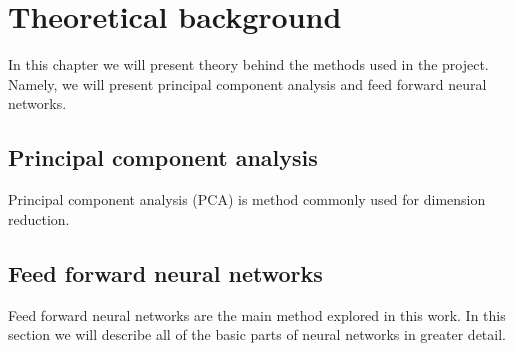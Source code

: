 \chapter{Theoretical background}
\label{chap:background}

In this chapter we will present theory behind the methods used in the project. 
Namely, we will present principal component analysis and feed forward neural networks.

\section{Principal component analysis}
Principal component analysis (PCA) is method commonly used for dimension reduction.

\section{Feed forward neural networks}
Feed forward neural networks are the main method explored in this work.
In this section we will describe all of the basic parts of neural networks in greater detail.